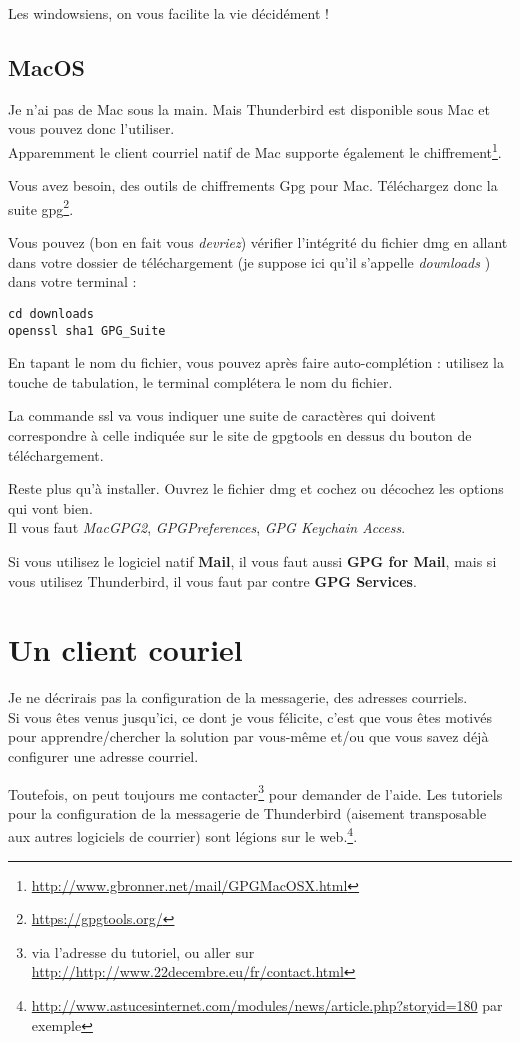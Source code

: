 Les windowsiens, on vous facilite la vie décidément !

\subsection{MacOS}\label{macos}

Je n'ai pas de Mac sous la main. Mais Thunderbird est disponible sous
Mac et vous pouvez donc l'utiliser.\\Apparemment
le client courriel natif de Mac supporte également le chiffrement\footnote{\url{http://www.gbronner.net/mail/GPGMacOSX.html}}.

Vous avez besoin, des outils de chiffrements Gpg pour Mac. Téléchargez donc la suite
gpg\footnote{\url{https://gpgtools.org/}}.

Vous pouvez (bon en fait vous \emph{devriez}) vérifier l'intégrité du
fichier dmg en allant dans votre dossier de téléchargement (je suppose
ici qu'il s'appelle \emph{downloads} ) dans votre terminal :

\begin{lstlisting}
cd downloads
openssl sha1 GPG_Suite
\end{lstlisting}

En tapant le nom du fichier, vous pouvez après faire auto-complétion :
utilisez la touche de tabulation, le terminal complétera le nom du
fichier.

La commande ssl va vous indiquer une suite de caractères qui doivent
correspondre à celle indiquée sur le site de gpgtools en dessus du
bouton de téléchargement.

Reste plus qu'à installer. Ouvrez le fichier dmg et cochez ou décochez
les options qui vont bien.\\Il vous faut \emph{MacGPG2},
\emph{GPGPreferences}, \emph{GPG Keychain Access}.

Si vous utilisez le logiciel natif \textbf{Mail}, il vous faut aussi
\textbf{GPG for Mail}, mais si vous utilisez Thunderbird, il vous faut
par contre \textbf{GPG Services}.

\section{Un client couriel}\label{un-client-couriel}

\begin{notice}
Je ne décrirais pas la configuration de la messagerie, des adresses
courriels.\\Si vous êtes venus jusqu'ici, ce dont je vous félicite,
c'est que vous êtes motivés pour apprendre/chercher la solution par
vous-même et/ou que vous savez déjà configurer une adresse courriel.

Toutefois, on peut toujours me contacter\footnote{via l'adresse du tutoriel, ou aller sur \url{http://http://www.22decembre.eu/fr/contact.html}} pour demander de
l'aide. Les tutoriels pour la configuration de la messagerie de
Thunderbird (aisement transposable aux autres logiciels de courrier) sont légions sur le web.\footnote{\url{http://www.astucesinternet.com/modules/news/article.php?storyid=180} par exemple}.
\end{notice}

